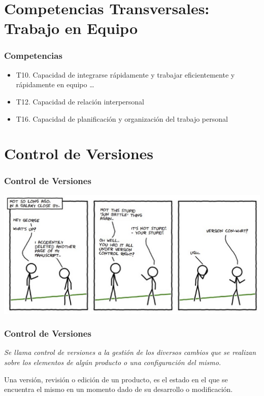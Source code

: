 \documentclass{beamer}
\begin{document}
\section{Competencias Transversales: Trabajo en Equipo}

\begin{frame}
\frametitle{Competencias}
\begin{itemize}
\item
\pause
T10. Capacidad de integrarse rápidamente y {\color{blue} trabajar} eficientemente y rápidamente {\color{blue} en equipo} \ldots %
\pause
\item T12. Capacidad de {\color{blue} relación interpersonal} %
\pause
\item T16. Capacidad de {\color{blue} planificación y organización} del trabajo personal %
\end{itemize}

\end{frame}

\section{Control de Versiones}

\begin{frame}
\frametitle{Control de Versiones}
\begin{center}
\includegraphics[width=1.0\textwidth]{img/versioncontrol1.eps}
\end{center}
\end{frame}

\begin{frame}
\frametitle{Control de Versiones}
\begin{center}
{\it Se llama {\color{red} control de versiones} a la gestión de los diversos cambios que se realizan sobre los elementos de algún producto o una configuración del mismo. 

Una {\color{blue} versión, revisión o edición de un producto}, es el estado en el que se encuentra el mismo en un momento dado de su desarrollo o modificación. }
\end{center}
\end{frame}
\end{document}
